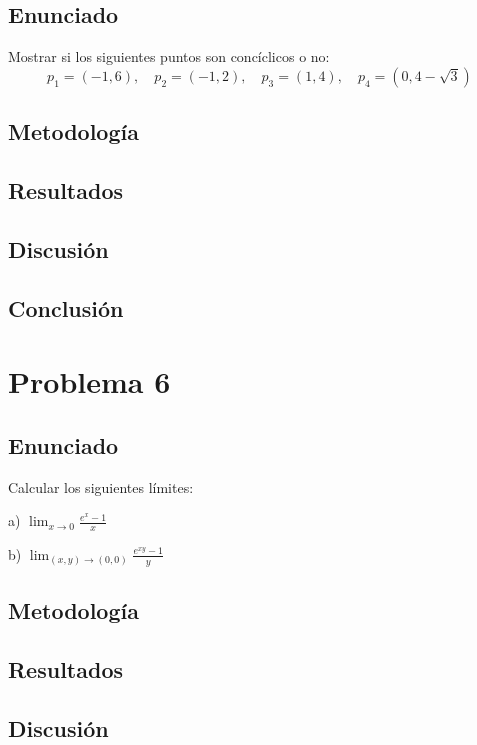 \documentclass{article}
\begin{document}
\subsection{Enunciado}
Mostrar si los siguientes puntos son concíclicos o no:
$$p_1 = (-1, 6), \quad p_2 = (-1, 2), \quad p_3 = (1, 4), \quad p_4 = (0, 4 - \sqrt{3})$$

\subsection{Metodología}

\subsection{Resultados}
\setcounter{equation}{0}

\subsection{Discusión}

\subsection{Conclusión}

\section{Problema 6}

\subsection{Enunciado}
Calcular los siguientes límites:

a) $\lim_{x \to 0} \frac{e^x - 1}{x}$

b) $\lim_{(x,y) \to (0,0)} \frac{e^{xy} - 1}{y}$

\subsection{Metodología}

\subsection{Resultados}
\setcounter{equation}{0}

\subsection{Discusión}
\end{document}
